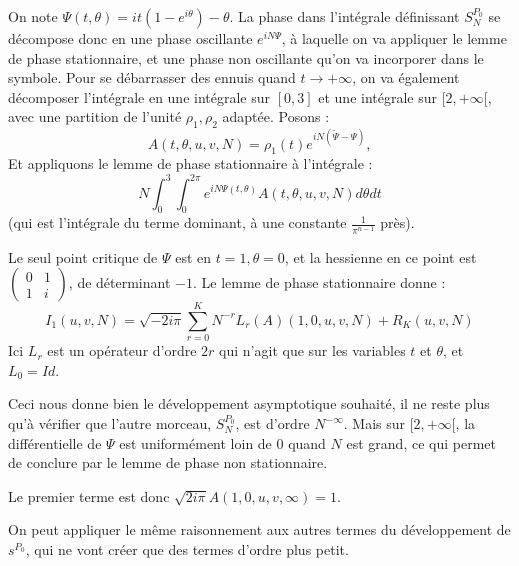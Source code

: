 \begin{preuve}
	On note $\Psi(t,\theta) = it(1-e^{i\theta})-\theta$. La phase dans l'intégrale définissant $S_N^{P_0}$ se décompose donc en une phase oscillante $e^{iN\Psi}$, à laquelle on va appliquer le lemme de phase stationnaire, et une phase non oscillante qu'on va incorporer dans le symbole. Pour se débarrasser des ennuis quand $t \to +\infty$, on va également décomposer l'intégrale en une intégrale sur $[0,3]$ et une intégrale sur $[2,+\infty[$, avec une partition de l'unité $\rho_1,\rho_2$ adaptée. Posons :
	\begin{equation*}
		A(t,\theta, u,v,N) = \rho_1(t)e^{iN(\tilde{\Psi}-\Psi)},
	\end{equation*} 
	Et appliquons le lemme de phase stationnaire à l'intégrale :
	\begin{equation*}
		N\int_0^3\int_0^{2\pi}e^{iN\Psi(t,\theta)}A(t,\theta, u,v,N)d\theta  dt
	\end{equation*}
	(qui est l'intégrale du terme dominant, à une constante $\frac{1}{\pi^{n-1}}$ près).
	
	Le seul point critique de $\Psi$ est en $t=1, \theta=0$, et la hessienne en ce point est $\begin{pmatrix}
	0&1\\1&i
	\end{pmatrix}$, de déterminant $-1$. Le lemme de phase stationnaire donne :
	\begin{equation*}
	I_1(u,v,N) =\sqrt{-2i\pi}\sum_{r=0}^K N^{-r}L_r(A)(1,0,u,v,N) + R_K(u,v,N)
	\end{equation*}
	Ici $L_r$ est un opérateur d'ordre $2r$ qui n'agit que sur les variables $t$ et $\theta$, et $L_0=Id$. 
	
	Ceci nous donne bien le développement asymptotique souhaité, il ne reste plus qu'à vérifier que l'autre morceau, $S_N^{P_0}$, est d'ordre $N^{-\infty}$. Mais sur $[2,+\infty[$, la différentielle de $\Psi$ est uniformément loin de $0$ quand $N$ est grand, ce qui permet de conclure par le lemme de phase non stationnaire.
	
	Le premier terme est donc $\sqrt{2i\pi}A(1,0,u,v,\infty) = 1$.
	
	On peut appliquer le même raisonnement aux autres termes du développement de $s^{P_0}$, qui ne vont créer que des termes d'ordre plus petit.
	\end{preuve}
	
